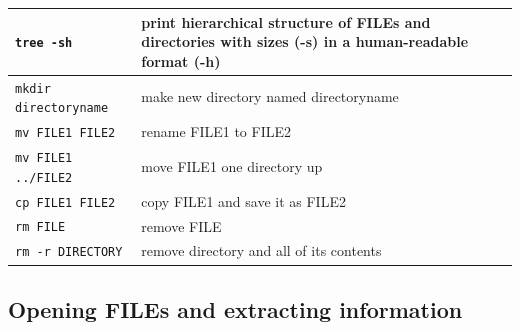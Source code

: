 \documentclass[11pt]{article}
\begin{document}
\begin{center}
\begin{tabular}{ll}
\hline
 \texttt{tree -sh}              &  print hierarchical structure of FILEs and directories with sizes (-s) in a human-readable format (-h)  \\
\hline
 \texttt{mkdir directoryname}   &  make new directory named directoryname                                                                 \\
\hline
 \texttt{mv FILE1 FILE2}        &  rename FILE1 to FILE2                                                                                  \\
\hline
 \texttt{mv FILE1 ../FILE2}     &  move FILE1 one directory up                                                                            \\
\hline
 \texttt{cp FILE1 FILE2}        &  copy FILE1 and save it as FILE2                                                                        \\
\hline
 \texttt{rm FILE}               &  remove FILE                                                                                            \\
\hline
 \texttt{rm -r DIRECTORY}       &  remove directory and all of its contents                                                               \\
\end{tabular}
\end{center}
\subsection{Opening FILEs and extracting information}
\label{sec-7-2}
\end{document}
